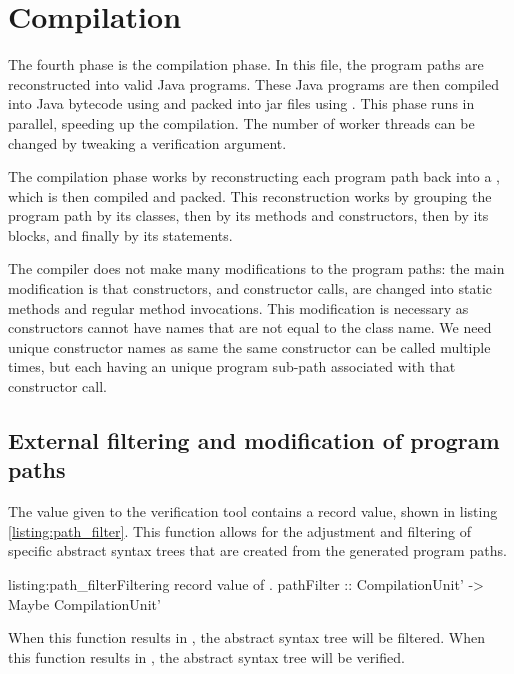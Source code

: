 \section{Compilation}
The fourth phase is the compilation phase. In this file, the program paths are
reconstructed into valid Java programs. These Java programs are then compiled into
Java bytecode using  and packed into jar files using .
This phase runs in parallel, speeding up the compilation. The number of worker
threads can be changed by tweaking a verification argument.

The compilation phase works by reconstructing each program path back into a 
, which is then compiled and packed. This
reconstruction works by grouping the program path by its classes, then by its 
methods and constructors, then by its blocks, and finally by its statements.

The compiler does not make many modifications to the program paths: the main
modification is that constructors, and constructor calls, are changed into 
static methods and regular method invocations. This modification is necessary as
constructors cannot have names that are not equal to the class name. We need
unique constructor names as same the same constructor can be called multiple times,
but each having an unique program sub-path associated with that constructor call.

\subsection{External filtering and modification of program paths}
The  value given to the verification tool contains a
record value, shown in listing \ref{listing:path_filter}. This function allows 
for the adjustment and filtering of specific abstract syntax trees that are
created from the generated program paths.
\begin{Haskell}{listing:path_filter}{Filtering record value of .}
pathFilter :: CompilationUnit' -> Maybe CompilationUnit'
\end{Haskell}
When this function results in , the abstract syntax tree 
will be filtered. When this function results in , the 
abstract syntax tree  will be verified.